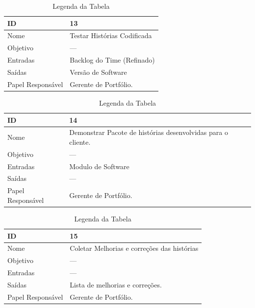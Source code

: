   \begin{table}[H]
    \centering
      \begin{tabular}{| m{5em} | m{10cm} |}
        \hline
        ID       & 13   \\ \hline
        Nome     & Testar Histórias Codificada  \\ \hline
        Objetivo & ---  \\ \hline
        Entradas & Backlog do Time (Refinado)\\ \hline
        Saídas   & Versão de Software \\ \hline
        Papel Responsável   & Gerente de Portfólio. \\ \hline
      \end{tabular}
      \caption{Legenda da Tabela}
      \label{tabela:atividade13}
  \end{table}

  \begin{table}[H]
    \centering
      \begin{tabular}{| m{5em} | m{10cm} |}
        \hline
        ID       & 14   \\ \hline
        Nome     & Demonstrar Pacote de histórias desenvolvidas para o cliente. \\ \hline
        Objetivo & --- \\ \hline
        Entradas & Modulo de Software\\ \hline
        Saídas   &  --- \\ \hline
        Papel Responsável   & Gerente de Portfólio. \\ \hline
      \end{tabular}
      \caption{Legenda da Tabela}
      \label{tabela:atividade14}
  \end{table}

  \begin{table}[H]
    \centering
      \begin{tabular}{| m{5em} | m{10cm} |}
        \hline
        ID       & 15   \\ \hline
        Nome     & Coletar Melhorias e correções das histórias  \\ \hline
        Objetivo & ---  \\ \hline
        Entradas & ---\\ \hline
        Saídas   & Lista de melhorias e correções. \\ \hline
        Papel Responsável   & Gerente de Portfólio. \\ \hline
      \end{tabular}
      \caption{Legenda da Tabela}
      \label{tabela:atividade15}
  \end{table}

